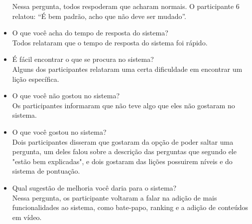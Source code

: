 \begin{itemize}
	Nessa pergunta, todos respoderam que acharam normais. O participante 6 relatou: ``É bem padrão, acho que não deve ser mudado''.
	\item O que você acha do tempo de resposta do sistema? \\
	Todos relataram que o tempo de resposta do sistema foi rápido.
	\item É fácil encontrar o que se procura no sistema? \\
	Alguns dos participantes relataram uma certa dificuldade em encontrar um lição específica.
	\item O que você não gostou no sistema? \\
	Os participantes informaram que não teve algo que eles não gostaram no sistema.
	\item O que você gostou no sistema? \\
	Dois participantes disseram que gostaram da opção de poder saltar uma pergunta, um deles falou sobre a descrição das perguntas que segundo ele "estão bem explicadas", e dois gostaram das lições possuirem níveis e do sistema de pontuação.
	\item Qual sugestão de melhoria você daria para o sistema? \\
	Nessa pergunta, os participante voltaram a falar na adição de mais funcionalidades ao sistema, como bate-papo, ranking e a adição de conteúdos em vídeo.
\end{itemize}